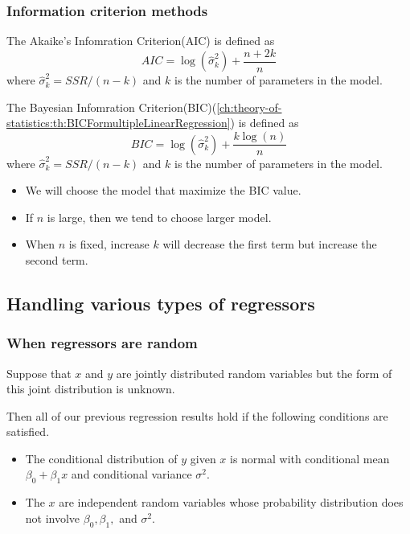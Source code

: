 \begin{refsection}
\subsubsection{Information criterion methods}
\begin{definition}
	The Akaike's Infomration Criterion(AIC) is defined as
	$$AIC = \log(\hat{\sigma}_k^2) + \frac{n+2k}{n}$$
	where $\hat{\sigma}_k^2 = SSR/(n-k)$ and $k$ is the number of parameters in the model.
\end{definition}

\begin{definition}
	The Bayesian Infomration Criterion(BIC)(\autoref{ch:theory-of-statistics:th:BICFormultipleLinearRegression}) is defined as
	$$BIC = \log(\hat{\sigma}_k^2) + \frac{k\log(n)}{n}$$
	where $\hat{\sigma}_k^2 = SSR/(n-k)$ and $k$ is the number of parameters in the model.
\end{definition}

\begin{remark}\hfill
	\begin{itemize}
		\item We will choose the model that maximize the BIC value.
		\item If $n$ is large, then we tend to choose larger model.
		\item When $n$ is fixed, increase $k$ will decrease the first term but increase the second term.
	\end{itemize}
\end{remark}

\subsection{Handling various types of regressors}

\subsubsection{When regressors are random}


\begin{note}\cite[49]{montgomery2012introduction}
Suppose that $x$ and $y$ are jointly distributed random variables but the form of this joint distribution is unknown.

Then all of our previous regression results hold if the following conditions are satisfied.
\begin{itemize}
	\item The conditional distribution of $y$ given $x$ is normal with conditional mean $\beta_0 + \beta_1 x$ and conditional variance $\sigma^2$.
	\item The $x$ are independent random variables whose probability distribution does not involve $\beta_0,\beta_1,$ and $\sigma^2$.
\end{itemize}	
\end{note}



\end{refsection}
